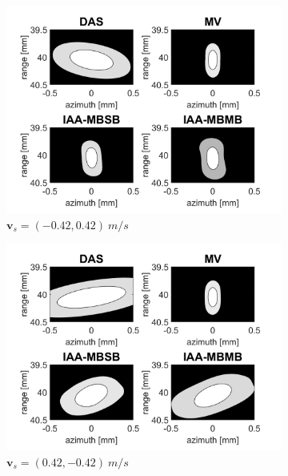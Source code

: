 \begin{figure}[ht]
\begin{subfigure}[t]{0.48\linewidth}
        \includegraphics[width=\linewidth]{./images/results/2.1/motion_-45_-06.png}
        \caption{$\boldsymbol{v}_s = (-0.42, 0.42)~m/s$}
    \end{subfigure}
    \quad
    \begin{subfigure}[t]{0.48\linewidth}
        \includegraphics[width=\linewidth]{./images/results/2.1/motion_-45_06.png}
        \caption{$\boldsymbol{v}_s = (0.42, -0.42)~m/s$}
    \end{subfigure}
    \quad
    \begin{subfigure}[t]{0.48\linewidth}

\end{subfigure}
\end{figure}
